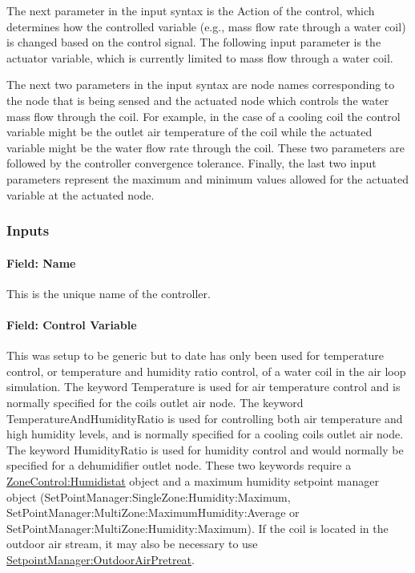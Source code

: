 The next parameter in the input syntax is the Action of the control, which determines how the controlled variable (e.g., mass flow rate through a water coil) is changed based on the control signal. The following input parameter is the actuator variable, which is currently limited to mass flow through a water coil.

The next two parameters in the input syntax are node names corresponding to the node that is being sensed and the actuated node which controls the water mass flow through the coil. For example, in the case of a cooling coil the control variable might be the outlet air temperature of the coil while the actuated variable might be the water flow rate through the coil. These two parameters are followed by the controller convergence tolerance. Finally, the last two input parameters represent the maximum and minimum values allowed for the actuated variable at the actuated node.

\subsubsection{Inputs}\label{inputs-008}

\paragraph{Field: Name}\label{field-name-007}

This is the unique name of the controller.

\paragraph{Field: Control Variable}\label{field-control-variable}

This was setup to be generic but to date has only been used for temperature control, or temperature and humidity ratio control, of a water coil in the air loop simulation. The keyword Temperature is used for air temperature control and is normally specified for the coils outlet air node. The keyword TemperatureAndHumidityRatio is used for controlling both air temperature and high humidity levels, and is normally specified for a cooling coils outlet air node. The keyword HumidityRatio is used for humidity control and would normally be specified for a dehumidifier outlet node. These two keywords require a \hyperref[zonecontrolhumidistat]{ZoneControl:Humidistat} object and a maximum humidity setpoint manager object (SetPointManager:SingleZone:Humidity:Maximum, SetPointManager:MultiZone:MaximumHumidity:Average or SetPointManager:MultiZone:Humidity:Maximum). If the coil is located in the outdoor air stream, it may also be necessary to use \hyperref[setpointmanageroutdoorairpretreat]{SetpointManager:OutdoorAirPretreat}.

